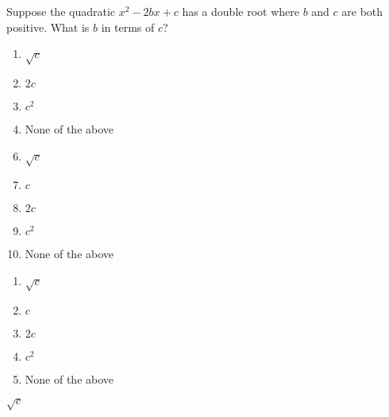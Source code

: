 



 Suppose the quadratic $x^{2}-2bx+c$ has a double root where $b$ and $c$ are both positive.  What is $b$ in terms of $c$? 


\ifsat
	\begin{enumerate}[label=\Alph*)]
		\item   $\sqrt{c}$%
		\item  $2c$
		\item  $c^2$
		\item  None of the above
	\end{enumerate}
\else
\fi

\ifacteven
	\begin{enumerate}[label=\textbf{\Alph*.},itemsep=\fill,align=left]
		\setcounter{enumii}{5}
		\item   $\sqrt{c}$%
		\item  $c$ 
		\item  $2c$
		\addtocounter{enumii}{1}
		\item  $c^2$
		\item  None of the above
	\end{enumerate}
\else
\fi

\ifactodd
	\begin{enumerate}[label=\textbf{\Alph*.},itemsep=\fill,align=left]
		\item   $\sqrt{c}$%
		\item  $c$ 
		\item  $2c$
		\item  $c^2$
		\item  None of the above
	\end{enumerate}
\else
\fi

\ifgridin
   $\sqrt{c}$%
		
\else
\fi

